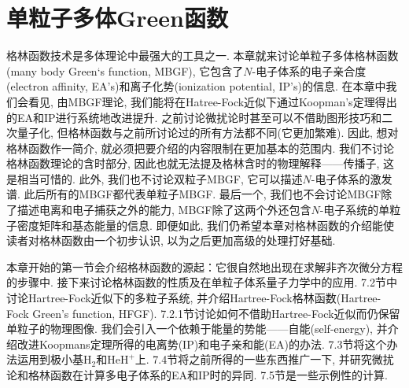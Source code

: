 \chapter{单粒子多体Green函数}
格林函数技术是多体理论中最强大的工具之一. 本章就来讨论单粒子多体格林函数(many body Green`s function, MBGF), 它包含了$N$-电子体系的电子亲合度(electron affinity, EA's)和离子化势(ionization potential, IP's)的信息. 在本章中我们会看见, 由MBGF理论, 我们能将在Hatree-Fock近似下通过Koopman's定理得出的EA和IP进行系统地改进提升. 之前讨论微扰论时甚至可以不借助图形技巧和二次量子化, 但格林函数与之前所讨论过的所有方法都不同(它更加繁难). 因此, 想对格林函数作一简介, 就必须把要介绍的内容限制在更加基本的范围内. 我们不讨论格林函数理论的含时部分, 因此也就无法提及格林含时的物理解释——传播子, 这是相当可惜的. 此外, 我们也不讨论双粒子MBGF, 它可以描述$N$-电子体系的激发谱. 此后所有的MBGF都代表单粒子MBGF. 最后一个, 我们也不会讨论MBGF除了描述电离和电子捕获之外的能力, MBGF除了这两个外还包含$N$-电子系统的单粒子密度矩阵和基态能量的信息. 即便如此, 我们仍希望本章对格林函数的介绍能使读者对格林函数由一个初步认识, 以为之后更加高级的处理打好基础.

本章开始的第一节会介绍格林函数的源起：它很自然地出现在求解非齐次微分方程的步骤中. 接下来讨论格林函数的性质及在单粒子体系量子力学中的应用. 7.2节中讨论Hartree-Fock近似下的多粒子系统, 并介绍Hartree-Fock格林函数(Hartree-Fock Green's function, HFGF). 7.2.1节讨论如何不借助Hartree-Fock近似而仍保留单粒子的物理图像. 我们会引入一个依赖于能量的势能——自能(self-energy), 并介绍改进Koopmans定理所得的电离势(IP)和电子亲和能(EA)的办法. 7.3节将这个办法运用到极小基$\mathrm{H}_2$和$\mathrm{HeH}^+$上. 7.4节将之前所得的一些东西推广一下, 并研究微扰论和格林函数在计算多电子体系的EA和IP时的异同. 7.5节是一些示例性的计算.
